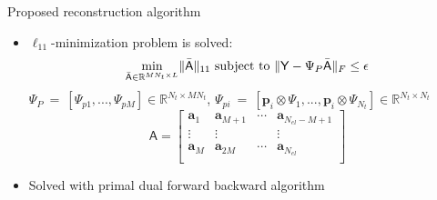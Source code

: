 {\begin{block}{Proposed reconstruction algorithm}
	\begin{itemize}
		\item $\ell_{11}$-minimization problem is solved:
		\begin{equation*}
		\min_{\bar{\mathsf{A}} \in \mathbb{R}^{MN_t \times L}} \lVert \bar{\mathsf{A}} \lVert_{11}
		\textnormal{ subject to } \| \mathsf{Y}- \Psi_{P}\bar{\mathsf{A}}\|_F\leq\epsilon
		\end{equation*}
		$\Psi_{P}~=~\left[\Psi_{p1}, ..., \Psi_{pM}\right] \in \mathbb{R}^{N_t \times M N_t}$, $\Psi_{pi}~=~\left[\bm{p}_i \otimes \Psi_1, ..., \bm{p}_i \otimes \Psi_{N_t}\right] \in \mathbb{R}^{N_t \times N_t}$ 
		\begin{equation*}
		\mathsf{A}=
		\begin{bmatrix}
		\bm{a}_1 & \bm{a}_{M+1} & \dotsb & \bm{a}_{N_{el}-M+1}\\
		\vdots & \vdots & & \vdots \\
		\bm{a}_M & \bm{a}_{2M} & \dotsb &\bm{a}_{N_{el}} \\
		\end{bmatrix}
		\end{equation*}
		\item Solved with primal dual forward backward algorithm~\cite{combettes2014} 
	\end{itemize}
\end{block}
}%